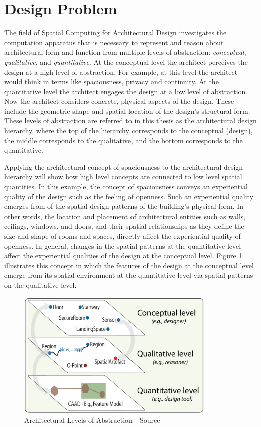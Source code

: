 \documentclass[12pt]{ucthesis}
\begin{document}
\section{Design Problem}
The field of Spatial Computing for Architectural Design \cite{bhatt-spatial-computing} investigates the computation apparatus that is necessary to represent and reason about architectural form and function from multiple levels of abstraction: \emph{conceptual}, \emph{qualitative}, and \emph{quantitative}. At the conceptual level the architect perceives the design at a high level of abstraction. For example, at this level the architect would think in terms like spaciousness, privacy and continuity. At the quantitative level the architect engages the design at a low level of abstraction. Now the architect considers concrete, physical aspects of the design. These include the geometric shape and spatial location of the design's structural form. These levels of abstraction are referred to in this thesis as the architectural design hierarchy, where the top of the hierarchy corresponds to the conceptual (design), the middle corresponds to the qualitative, and the bottom corresponds to the quantitative. 

Applying the architectural concept of spaciousness to the architectural design hierarchy will show how high level concepts are connected to low level spatial quantities. In this example, the concept of spaciousness conveys an experiential quality of the design such as the feeling of openness. Such an experiential quality emerges from of the spatial design patterns of the building's physical form. In other words, the location and placement of architectural entities such as walls, ceilings, windows, and doors, and their spatial relationships as they define the size and shape of rooms and spaces, directly affect the experiential quality of openness. In general, changes in the spatial patterns at the quantitative level affect the experiential qualities of the design at the conceptual level. Figure \ref{multi-perspective-reps} illustrates this concept in which the features of the design at the conceptual level emerge from its spatial environment at the quantitative level via spatial patterns on the qualitative level. 

\begin{figure}[t]
\centering
\includegraphics[width=95mm]{multi-perspective-reps}
\caption{Architectural Levels of Abstraction - Source \cite{bhatt-spatial-computing}}
\label{multi-perspective-reps}
\end{figure}
\end{document}
